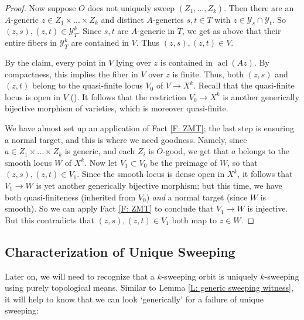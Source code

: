 \documentclass{amsart}
\theoremstyle{definition}
\newcommand{\acl}{\operatorname{acl}}
\begin{document}
\begin{proof}
    Now suppose $O$ does not uniquely sweep $(Z_1,...,Z_k)$. Then there are an $A$-generic $z\in Z_1\times...\times Z_k$ and distinct $A$-generics $s,t\in T$ with $z\in\mathcal Y_s\cap\mathcal Y_t$. So $(z,s),(z,t)\in\mathcal Y_T^k$. Since $s,t$ are $A$-generic in $T$, we get as above that their entire fibers in $\mathcal Y_T^k$ are contained in $V$. Thus $(z,s),(z,t)\in V$.
    
    By the claim, every point in $V$ lying over $z$ is contained in $\acl(Az)$. By compactness, this implies the fiber in $V$ over $z$ is finite. Thus, both $(z,s)$ and $(z,t)$ belong to the quasi-finite locus $V_0$ of $V\rightarrow X^k$. Recall that the quasi-finite locus is open in $V$ (\cite[\href{https://stacks.math.columbia.edu/tag/01TI}{Lemma 01TI}]{stacks-project}). It follows that the restriction $V_0\rightarrow X^k$ is another generically bijective morphism of varieties, which is moreover quasi-finite.
    
    We have almost set up an application of Fact \ref{F: ZMT}; the last step is ensuring a normal target, and this is where we need goodness. Namely, since $a\in Z_1\times...\times Z_k$ is generic, and each $Z_i$ is $O$-good, we get that $a$ belongs to the smooth locus $W$ of $X^k$. Now let $V_1\subset V_0$ be the preimage of $W$, so that $(z,s),(z,t)\in V_1$. Since the smooth locus is dense open in $X^k$, it follows that $V_1\rightarrow W$ is yet another generically bijective morphism; but this time, we have both quasi-finiteness (inherited from $V_0$) \textit{and} a normal target (since $W$ is smooth). So we can apply Fact \ref{F: ZMT} to conclude that $V_1\rightarrow W$ is injective. But this contradicts that $(z,s),(z,t)\in V_1$ both map to $z\in W$.
\end{proof}

\subsection{Characterization of Unique Sweeping} Later on, we will need to recognize that a $k$-sweeping orbit is uniquely $k$-sweeping using purely topological means. Similar to Lemma \ref{L: generic sweeping witness}, it will help to know that we can look `generically' for a failure of unique sweeping:
\end{document}
